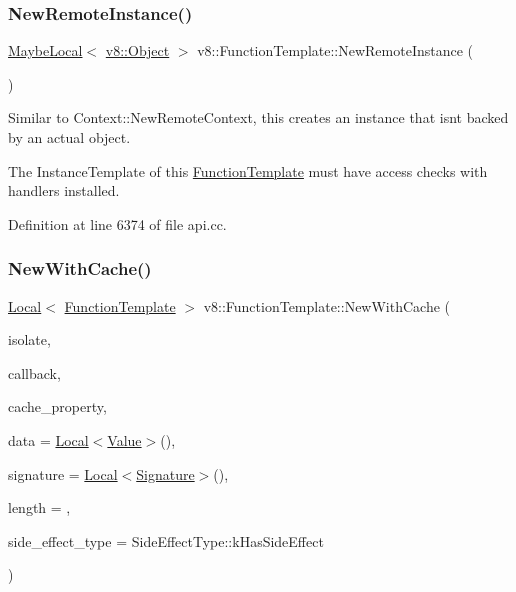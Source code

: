 \subsubsection{\texorpdfstring{New\+Remote\+Instance()}{NewRemoteInstance()}}
{\footnotesize\ttfamily \mbox{\hyperlink{classv8_1_1MaybeLocal}{Maybe\+Local}}$<$ \mbox{\hyperlink{classv8_1_1Object}{v8\+::\+Object}} $>$ v8\+::\+Function\+Template\+::\+New\+Remote\+Instance (\begin{DoxyParamCaption}{ }\end{DoxyParamCaption})}

Similar to Context\+::\+New\+Remote\+Context, this creates an instance that isn\textquotesingle{}t backed by an actual object.

The Instance\+Template of this \mbox{\hyperlink{classv8_1_1FunctionTemplate}{Function\+Template}} must have access checks with handlers installed. 

Definition at line 6374 of file api.\+cc.

\mbox{\label{classv8_1_1FunctionTemplate_a2f623ce4c7b190d1eb8c3d53b546609d}} 
\subsubsection{\texorpdfstring{New\+With\+Cache()}{NewWithCache()}}
{\footnotesize\ttfamily \mbox{\hyperlink{classv8_1_1Local}{Local}}$<$ \mbox{\hyperlink{classv8_1_1FunctionTemplate}{Function\+Template}} $>$ v8\+::\+Function\+Template\+::\+New\+With\+Cache (\begin{DoxyParamCaption}\item[{Isolate $\ast$}]{isolate,  }\item[{Function\+Callback}]{callback,  }\item[{\mbox{\hyperlink{classv8_1_1Local}{Local}}$<$ \mbox{\hyperlink{classv8_1_1Private}{Private}} $>$}]{cache\+\_\+property,  }\item[{\mbox{\hyperlink{classv8_1_1Local}{Local}}$<$ \mbox{\hyperlink{classv8_1_1Value}{Value}} $>$}]{data = {\ttfamily \mbox{\hyperlink{classv8_1_1Local}{Local}}$<$\mbox{\hyperlink{classv8_1_1Value}{Value}}$>$()},  }\item[{\mbox{\hyperlink{classv8_1_1Local}{Local}}$<$ \mbox{\hyperlink{classv8_1_1Signature}{Signature}} $>$}]{signature = {\ttfamily \mbox{\hyperlink{classv8_1_1Local}{Local}}$<$\mbox{\hyperlink{classv8_1_1Signature}{Signature}}$>$()},  }\item[{\mbox{\hyperlink{classint}{int}}}]{length = {},  }\item[{\mbox{\hyperlink{namespacev8_a29711319c2b9fc7716d65faee2f7b9cb}{Side\+Effect\+Type}}}]{side\+\_\+effect\+\_\+type = {\ttfamily SideEffectType\+:\+:kHasSideEffect} }\end{DoxyParamCaption})\hspace{0.3cm}{\ttfamily [static]}}

